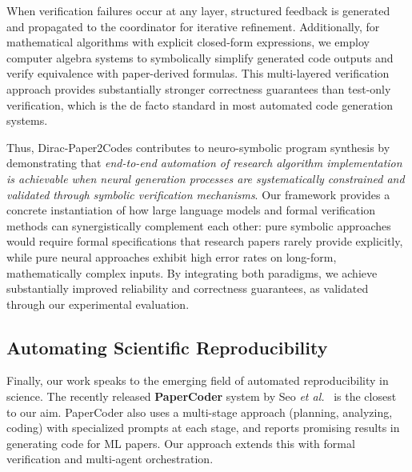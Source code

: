 \documentclass{ieeeaccess}
\begin{document}
When verification failures occur at any layer, structured feedback is generated and propagated to the coordinator for iterative refinement. Additionally, for mathematical algorithms with explicit closed-form expressions, we employ computer algebra systems to symbolically simplify generated code outputs and verify equivalence with paper-derived formulas. This multi-layered verification approach provides substantially stronger correctness guarantees than test-only verification, which is the de facto standard in most automated code generation systems.

Thus, Dirac-Paper2Codes contributes to neuro-symbolic program synthesis by demonstrating that \emph{end-to-end automation of research algorithm implementation is achievable when neural generation processes are systematically constrained and validated through symbolic verification mechanisms}. Our framework provides a concrete instantiation of how large language models and formal verification methods can synergistically complement each other: pure symbolic approaches would require formal specifications that research papers rarely provide explicitly, while pure neural approaches exhibit high error rates on long-form, mathematically complex inputs. By integrating both paradigms, we achieve substantially improved reliability and correctness guarantees, as validated through our experimental evaluation.

\subsection{Automating Scientific Reproducibility}
Finally, our work speaks to the emerging field of automated reproducibility in science. The recently released \textbf{PaperCoder} system by Seo \emph{et al.}~\cite{seo2024papercoder} is the closest to our aim. PaperCoder also uses a multi-stage approach (planning, analyzing, coding) with specialized prompts at each stage, and reports promising results in generating code for ML papers. Our approach extends this with formal verification and multi-agent orchestration.
\end{document}
